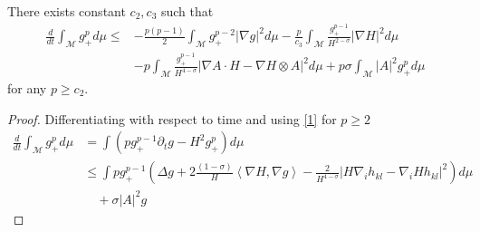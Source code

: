 \begin{lemma}\label{dgdt}
   There exists constant $ c_{2} , c_{3}$ such that 
    \begin{align*}
        \frac{d}{dt}\int_{ \mathcal{M}} g_{+}^{p} d \mu \le& - \frac{p(p-1)}{2} \int_{ \mathcal{M}} g_{+}^{p-2}| \nabla g|^{2}d \mu - \frac{p}{c_{3}} \int_{ \mathcal{M}} \frac{g_{+}^{p-1}}{H^{2 -\sigma}}|\nabla H|^{2} d \mu \\
        & - p \int_{ \mathcal{M}} \frac{g_{+}^{p-1}}{H^{4-\sigma}}| \nabla A \cdot H - \nabla H \otimes A|^{2} d \mu + p \sigma \int_{ \mathcal{ M}}|A|^{2} g_{+}^{p} d \mu 
    \end{align*}
   for any $ p \ge c_{2} $.
\end{lemma}

\begin{proof}
    Differentiating with respect to time and using \cref{1} for $ p \ge 2 $
    \begin{align}
        \frac{d}{dt} \int_{ \mathcal{M}} g_{+}^{p} d \mu  & =  \int \left(pg_{+}^{p-1} \partial_{t}g - H^{2}g_{+}^{p}\right) d \mu \nonumber \\
        & \le \int pg_{+}^{p-1}\left( \Delta g + 2\frac{(1-\sigma)}{H}\left< \nabla H, \nabla g\right>  - \frac{2}{H^{4-\sigma}}|H \nabla_{i}h_{kl} - \nabla_{i}Hh_{kl}|^{2}\right)d \mu  \nonumber\\
        & \quad + \sigma |A|^{2} g \label{Lpg}
    \end{align}


\end{proof}
